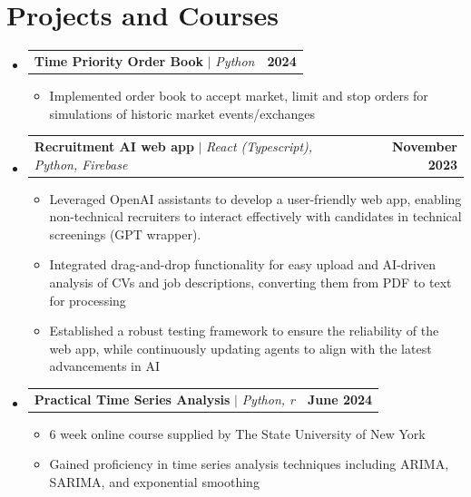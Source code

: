 \documentclass[letterpaper,11pt]{article}
\makeatletter
\newcommand{\resumeItem}[1]{
  \item\small{
    {#1 \vspace{-2pt}}
  }
}
\newcommand{\resumeProjectHeading}[2]{
    \item
    \begin{tabular*}{1.001\textwidth}{l@{\extracolsep{\fill}}r}
      \small#1 & \textbf{\small #2}\\
    \end{tabular*}\vspace{-7pt}
}
\newcommand{\resumeSubHeadingListStart}{\begin{itemize}[leftmargin=0.0in, label={}]}
\newcommand{\resumeSubHeadingListEnd}{\end{itemize}}
\newcommand{\resumeItemListStart}{\begin{itemize}}
\newcommand{\resumeItemListEnd}{\end{itemize}\vspace{-5pt}}
\makeatother
\begin{document}
\section{Projects and Courses}
    \vspace{-5pt}
    \resumeSubHeadingListStart

        \resumeProjectHeading
          {\textbf{Time Priority Order Book} $|$ \emph{Python}}{2024}
        \resumeItemListStart
            \vspace{4pt}
            \resumeItem{Implemented order book to accept market, limit and stop orders for simulations of historic market events/exchanges}
          \resumeItemListEnd
          \vspace{-8pt}

    \resumeProjectHeading
          {\textbf{Recruitment AI web app} $|$ \emph{React (Typescript), Python, Firebase}}{November 2023}
        \resumeItemListStart
            \vspace{4pt}
            \resumeItem{Leveraged OpenAI assistants to develop a user-friendly web app, enabling non-technical recruiters to interact effectively with candidates in technical screenings (GPT wrapper).}
            \resumeItem{Integrated drag-and-drop functionality for easy upload and AI-driven analysis of CVs and job descriptions, converting them from PDF to text for processing}
            \resumeItem{Established a robust testing framework to ensure the reliability of the web app, while continuously updating agents to align with the latest advancements in AI}
          \resumeItemListEnd
          \vspace{-8pt}

      \resumeProjectHeading
          {\textbf{Practical Time Series Analysis} $|$ \emph{Python, r}}{June 2024}
        \resumeItemListStart
            \vspace{4pt}
            \resumeItem{6 week online course supplied by The State University of New York}
            \resumeItem{Gained proficiency in time series analysis techniques including ARIMA, SARIMA, and exponential smoothing}
          \resumeItemListEnd
          \vspace{-8pt}
          
    \resumeSubHeadingListEnd
\end{document}

